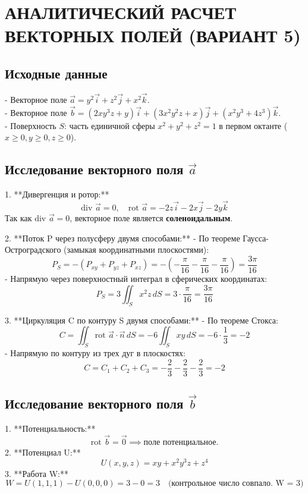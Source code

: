 \documentclass[11pt,russian]{article}
\begin{document}
\newpage

\section{АНАЛИТИЧЕСКИЙ РАСЧЕТ ВЕКТОРНЫХ ПОЛЕЙ (ВАРИАНТ 5)}

\subsection{Исходные данные}
- Векторное поле $\vec{a} = y^2 \vec{i} + z^2 \vec{j} + x^2 \vec{k}$.\\
- Векторное поле $\vec{b} = (2xy^3z + y) \vec{i} + (3x^2y^2z + x) \vec{j} + (x^2y^3 + 4z^3) \vec{k}$.\\
- Поверхность $S$: часть единичной сферы $x^2 + y^2 + z^2 = 1$ в первом октанте ($x \ge 0, y \ge 0, z \ge 0$).

\subsection{Исследование векторного поля $\vec{a}$}
1. **Дивергенция и ротор:**
   $$\text{div }\vec{a} = 0, \quad \text{rot }\vec{a} = -2z\vec{i} - 2x\vec{j} - 2y\vec{k}$$
   Так как $\text{div }\vec{a} = 0$, векторное поле является \textbf{соленоидальным}.

2. **Поток P через полусферу двумя способами:**
   - По теореме Гаусса-Остроградского (замыкая координатными плоскостями):
     $$P_S = -(P_{xy} + P_{yz} + P_{xz}) = -\left(-\frac{\pi}{16} - \frac{\pi}{16} - \frac{\pi}{16}\right) = \frac{3\pi}{16}$$
   - Напрямую через поверхностный интеграл в сферических координатах:
     $$P_S = 3 \iint_S x^2 z \, dS = 3 \cdot \frac{\pi}{16} = \frac{3\pi}{16}$$

3. **Циркуляция C по контуру S двумя способами:**
   - По теореме Стокса:
     $$C = \iint_S \text{rot }\vec{a} \cdot \vec{n} \, dS = -6 \iint_S xy \, dS = -6 \cdot \frac{1}{3} = -2$$
   - Напрямую по контуру из трех дуг в плоскостях:
     $$C = C_1 + C_2 + C_3 = -\frac{2}{3} - \frac{2}{3} - \frac{2}{3} = -2$$

\subsection{Исследование векторного поля $\vec{b}$}
1. **Потенциальность:**
   $$\text{rot }\vec{b} = \vec{0} \implies \text{поле потенциальное.}$$
2. **Потенциал U:**
   $$U(x,y,z) = xy + x^2 y^3 z + z^4$$
3. **Работа W:**
   $$W = U(1,1,1) - U(0,0,0) = 3 - 0 = 3 \quad \text{(контрольное число совпало. W = 3)}$$
\end{document}
